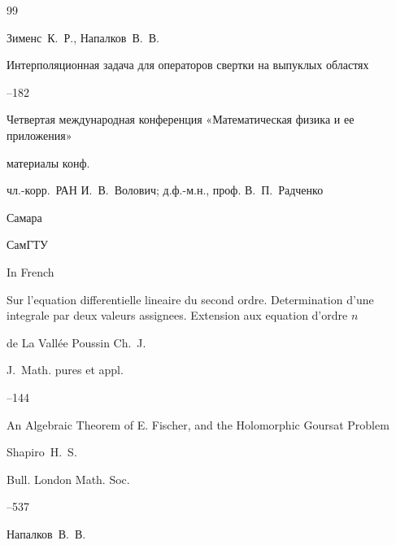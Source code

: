 \begin{thebibliography}{99}




\by Зименс~К.~Р., Напалков~В.~В. 

\paper Интерполяционная задача для операторов свертки на выпуклых областях

--182

\inbook Четвертая международная конференция «Математическая физика и ее приложения»

\bookinfo материалы конф. 

\eds чл.-корр.~РАН И.~В.~Волович; д.ф.-м.н., проф. В.~П.~Радченко

\publaddr Самара

\publ СамГТУ







\lang In French

\paper Sur l'equation differentielle lineaire du second ordre. Deter\-mi\-na\-tion d’une integrale par deux valeurs assignees. Extension aux equation d'ordre $n$

\by de La Vall\'ee Poussin Ch.~J.

\jour J.~Math. pures et appl.




--144





\paper An Algebraic Theorem of E. Fischer, and the Holomorphic Goursat Problem

\by Shapiro~H.~S.

\jour Bull. London Math. Soc.




--537







\by Напалков~В.~В.


\end{thebibliography}
